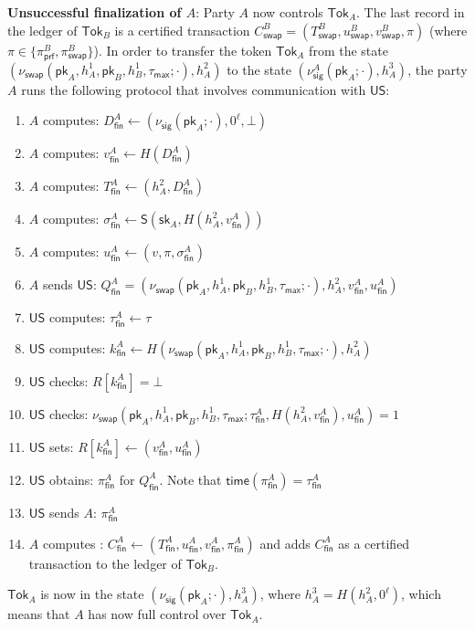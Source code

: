 \documentclass{article}
\newcommand{\sig}[0]{\mathsf{S}}
\newcommand{\pubkey}[0]{\mathsf{pk}}
\newcommand{\prikey}[0]{\mathsf{sk}}
\newcommand{\unisrv}[0]{\mathsf{US}}
\begin{document}
\noindent\textbf{Unsuccessful finalization of $A$}: Party $A$ now controls $\mathsf{Tok}_A$.
The last record in the ledger of $\mathsf{Tok}_B$ is a certified transaction $C^B_\mathsf{swap}=(T^B_\mathsf{swap},u^B_\mathsf{swap},v^B_\mathsf{swap},\pi)$ (where $\pi\in\{\pi^B_\mathsf{prf},\pi^B_\mathsf{swap}\}$). In order to transfer the token $\mathsf{Tok}_A$ from the state
$(\nu_\mathsf{swap}(\pubkey_A,h^1_A,\pubkey_B,h^1_B,\tau_\mathsf{max};\cdot),h^2_A)$
to the state $(\nu^A_\mathsf{sig}(\pubkey_A;\cdot),h^3_A)$, the party $A$ runs the following protocol that involves communication with $\unisrv$:
\begin{enumerate}
    \item $A$ computes: $D^A_\mathsf{fin}\gets (\nu_\mathsf{sig}(\pubkey_A;\cdot), 0^\ell,\bot)$
    \item $A$ computes: $v^A_\mathsf{fin}\gets H(D^A_\mathsf{fin})$
    \item $A$ computes: $T^A_\mathsf{fin}\gets (h^2_A, D^A_\mathsf{fin})$
    \item $A$ computes: $\sigma^A_\mathsf{fin}\gets \sig(\prikey_A,H(h^2_A,v^A_\mathsf{fin}))$
    \item $A$ computes: $u^A_\mathsf{fin}\gets (v,\pi,\sigma^A_\mathsf{fin})$
    \item $A$ sends $\unisrv$: $Q^A_\mathsf{fin}=(\nu_\mathsf{swap}(\pubkey_A,h^1_A,\pubkey_B,h^1_B,\tau_\mathsf{max};\cdot),h^2_A,v^A_\mathsf{fin},u^A_\mathsf{fin})$
    \item $\unisrv$ computes: $\tau^A_\mathsf{fin}\gets \tau$
    \item $\unisrv$ computes: $k^A_\mathsf{fin}\gets H(\nu_\mathsf{swap}(\pubkey_A,h^1_A,\pubkey_B,h^1_B,\tau_\mathsf{max};\cdot),h^2_A)$
    \item $\unisrv$ checks: $R[k^A_\mathsf{fin}]=\bot$
    \item $\unisrv$ checks: $\nu_\mathsf{swap}(\pubkey_A,h^1_A,\pubkey_B,h^1_B,\tau_\mathsf{max};\tau^A_\mathsf{fin},H(h^2_A,v^A_\mathsf{fin}),u^A_\mathsf{fin})=1$
    \item $\unisrv$ sets: $R[k^A_\mathsf{fin}]\gets (v^A_\mathsf{fin},u^A_\mathsf{fin})$
    \item $\unisrv$ obtains: $\pi^A_\mathsf{fin}$ for $Q^A_\mathsf{fin}$. Note that $\mathsf{time}(\pi^A_\mathsf{fin})=\tau^A_\mathsf{fin}$
    \item $\unisrv$ sends $A$: $\pi^A_\mathsf{fin}$
    \item $A$ computes : $C^A_\mathsf{fin}\gets (T^A_\mathsf{fin},u^A_\mathsf{fin},v^A_\mathsf{fin},\pi^A_\mathsf{fin})$ and adds $C^A_\mathsf{fin}$ as a certified transaction to the ledger of $\mathsf{Tok}_B$.
\end{enumerate}
$\mathsf{Tok}_A$ is now in the state $(\nu_\mathsf{sig}(\pubkey_A;\cdot),h^3_A)$, where $h^3_A=H(h^2_A,0^\ell)$, which means that $A$ has now full control over $\mathsf{Tok}_A$.
\end{document}
